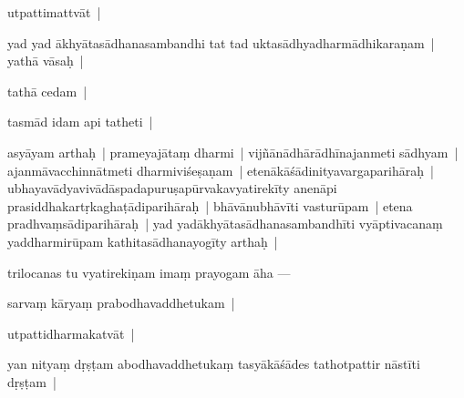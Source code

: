 \documentclass[article,12pt,a4paper]{memoir}%
\newcommand{\persName}[1]{#1}
\newcounter{parCount}
\begin{document}
	  \pstart \leavevmode%
	utpattimattvāt |
	{}
	\pend%
      

	  \pstart \leavevmode%
	yad yad ākhyātasādhanasambandhi tat tad uktasādhyadharmādhikaraṇam | yathā vāsaḥ |
	{}
	\pend%
      

	  \pstart \leavevmode%
	tathā cedam |
	{}
	\pend%
      

	  \pstart \leavevmode%
	tasmād idam api tatheti |\label{sarit__ratnakīrtinibandhāvali__104267}
	{}
	\pend%
      

	  \pstart \leavevmode%
	asyāyam arthaḥ | prameyajātaṃ dharmi | vijñānādhārādhīnajanmeti sādhyam | ajanmāvacchinnātmeti dharmiviśeṣaṇam | etenākāśādinityavargaparihāraḥ | ubhayavādyavivādāspadapuruṣapūrvakavya\leavevmode{}\label{RNAms_22b}tirekīty anenāpi prasiddhakartṛkaghaṭādiparihāraḥ | bhāvānubhāvīti vasturūpam | etena pradhvaṃsādiparihāraḥ | yad yadākhyātasādhanasambandhīti vyāptivacanaṃ yaddharmirūpam kathitasādhanayogīty arthaḥ |
	{}
	\pend%
      

	  \pstart \leavevmode%
	\label{thakur75-39.28}\label{sarit__ratnakīrtinibandhāvali__104795}\persName{trilocanas} tu vyatirekiṇam imaṃ prayogam āha —
	{}
	\pend%
      

	  \pstart \leavevmode%
	sarvaṃ kāryaṃ prabodhavaddhetukam |
	{}
	\pend%
      

	  \pstart \leavevmode%
	utpattidharmakatvāt |
	{}
	\pend%
      

	  \pstart \leavevmode%
	yan nityaṃ dṛṣṭam abodhavaddhetukaṃ tasyākāśādes tathotpattir nāstīti dṛṣṭam |
	{}
	\pend%
      
\end{document}
